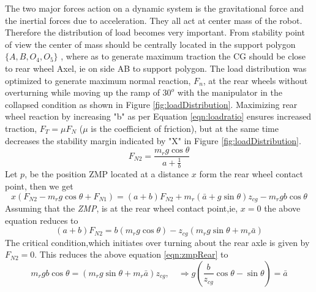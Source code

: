   The two major forces action on a dynamic system is the gravitational force and the inertial forces due to acceleration. They all act at center mass of the robot. Therefore the distribution of load becomes very important. From stability point of view the center of mass should be centrally located in the support polygon $\{A, B,O_4,O_5\}$ , where as to generate maximum traction the CG should be close to rear wheel Axel, ie on side AB  to support polygon. 
  The load distribution was optimized to generate maximum normal reaction, $F_n$,  at the rear wheels without overturning while moving up the ramp of $30^o$ with the manipulator in the collapsed condition as shown in Figure  \ref{fig:loadDistribution}. Maximizing rear wheel reaction by increasing  "b" as per Equation \ref{eqn:loadratio} ensures increased traction, $F_T=\mu F_N$ ($\mu$ is the coefficient of friction), but at the same time decreases the stability margin indicated by "X" in Figure \ref{fig:loadDistribution}.
  \begin{equation}
  \label{eqn:loadratio}
  F_{N2}=\frac{m_rg\cos\theta}{a+\frac{1}{b}}
  \end{equation}
  Let $p$, be the position ZMP located at a distance $x$ form the rear wheel contact point, then we get
  \begin{equation}
  \label{eqn:zmpRARS}
  x(F_{N2}-m_r g \cos \theta+F_{N1})=(a+b)F_{N2}+ m_r (\bar a +g \sin \theta )z_{cg} -m_r g b \cos\theta
  \end{equation}
   Assuming that the \textit{ZMP}, is at the rear wheel contact point,ie, $x=0$ the above equation reduces to
\begin{equation}
\label{eqn:zmpRear}
(a+b)F_{N2}=b(m_r g\cos\theta)-z_{cg}(m_r g\sin\theta+m_r \bar a)
\end{equation}
The critical condition,which  initiates over turning about the rear axle is given by $F_{N2} =0$.  This reduces the above equation \ref{eqn:zmpRear} to 
\begin{equation}
\label{eqn:overturn}
m_rgb\cos\theta=(m_rg\sin\theta+m_r \bar a)z_{cg}, \quad \Rightarrow g(\frac{b}{z_{cg}}\cos\theta-\sin\theta)=\bar a
\end{equation}

 

